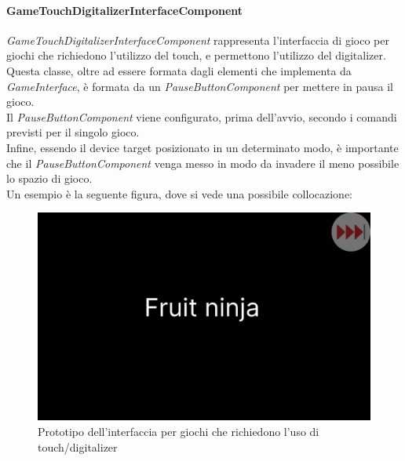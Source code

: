 \paragraph{GameTouchDigitalizerInterfaceComponent}
\emph{GameTouchDigitalizerInterfaceComponent} rappresenta l'interfaccia di gioco per giochi che richiedono l'utilizzo del touch, e permettono l'utilizzo del digitalizer.\\
Questa classe, oltre ad essere formata dagli elementi che implementa da \emph{GameInterface}, è formata da un \emph{PauseButtonComponent} per mettere in pausa il gioco.\\
Il \emph{PauseButtonComponent} viene configurato, prima dell'avvio, secondo i comandi previsti per il singolo gioco.\\
Infine, essendo il device target posizionato in un determinato modo, è importante che il \emph{PauseButtonComponent} venga messo in modo da invadere il meno possibile lo spazio di gioco.\\
Un esempio è la seguente figura, dove si vede una possibile collocazione:
\begin{figure}[h]
    \centering
    \includegraphics[width=340pt]{images/prog/TouchDigitMockup.png}
    \caption{Prototipo dell'interfaccia per giochi che richiedono l'uso di touch/digitalizer}
    \label{fig:touchDigit}
\end{figure}
\newpage
